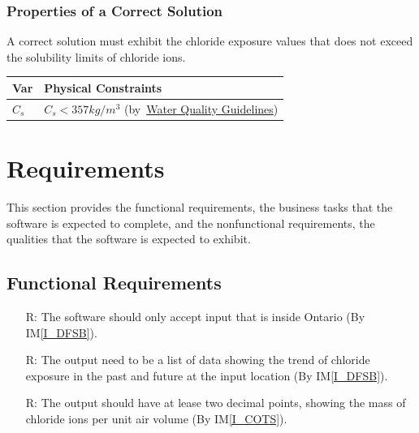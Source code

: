 \documentclass[12pt]{article}
\newcommand{\iref}[1]{IM\ref{#1}}
\newcounter{reqnum} %
\begin{document}
\noindent 
\subsubsection{Properties of a Correct Solution} \label{sec_CorrectSolution}

\noindent
A correct solution must exhibit the chloride exposure values that does not exceed the solubility limits of chloride ions. 


\begin{table}[!h]
\caption{Output Variables} \label{TblOutputVar}
\renewcommand{\arraystretch}{1.2}
\noindent \begin{longtable*}{l l} 
  \toprule
  \textbf{Var} & \textbf{Physical Constraints} \\
  \midrule 
  $C_s$ & $C_s < 357 kg/m^3$ (by~\href{https://www2.gov.bc.ca/assets/gov/environment/air-land-water/water/waterquality/water-quality-guidelines/approved-wqgs/chloride-or.pdf}{Water Quality Guidelines}) \\
  
   \bottomrule
\end{longtable*}
\end{table}

\newpage
\section{Requirements}
This section provides the functional requirements, the business tasks that the
software is expected to complete, and the nonfunctional requirements, the
qualities that the software is expected to exhibit.

\indent 
\newpage
\subsection{Functional Requirements}

\begin{itemize}

\item[R\refstepcounter{reqnum}\thereqnum \label{R_Inputs}:] The software should only accept input that is inside Ontario (By \iref{I_DFSB}).

\item[R\refstepcounter{reqnum}\thereqnum \label{R_OutputInputs}:] The output need to be a list of data showing the trend of chloride exposure in the past and future at the input location (By \iref{I_DFSB}).

\item[R\refstepcounter{reqnum}\thereqnum \label{R_Output}:] The output should have at lease two decimal points, showing the mass of chloride ions per unit air volume (By \iref{I_COTS}).


\end{itemize}
\end{document}
